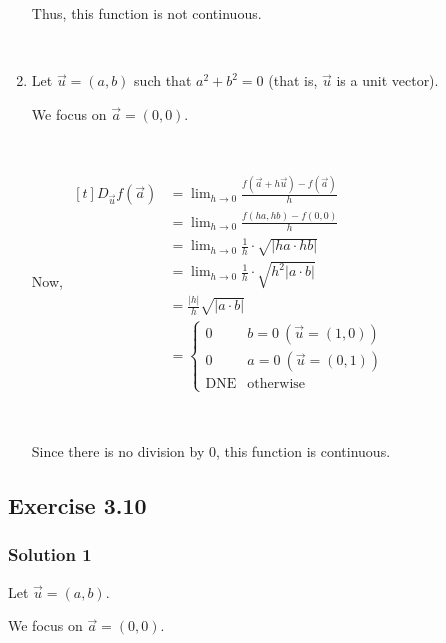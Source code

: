 \begin{enumerate}[label=\alph*)]
    Thus, this function is not continuous. 

    {~~~}

    \item Let $\vec{u} = (a,b)$ such that $a^2 + b^2 = 0$ (that is, $\vec{u}$ is a unit vector). 
    
    We focus on $\vec{a} = (0,0)$. 

    {~~~}

    Now, $\begin{aligned}[t]
        D_{\vec{u}} f(\vec{a}) & = \lim_{h\to0} \frac{f(\vec{a} + h\vec{u}) - f(\vec{a})}{h} \\
                               & = \lim_{h\to0} \frac{f(ha,hb) - f(0,0)}{h}                  \\
                               & = \lim_{h\to0} \frac{1}{h} \cdot \sqrt{| ha \cdot hb |}     \\
                               & = \lim_{h\to0} \frac{1}{h} \cdot \sqrt{h^2 | a \cdot b |}   \\
                               & = \frac{|h|}{h} \sqrt{| a \cdot b |}                        \\
                               & = \begin{cases}
                                       0          & b = 0 ~ (\vec{u} = (1,0)) \\
                                       0          & a = 0 ~ (\vec{u} = (0,1)) \\
                                       \text{DNE} & \text{otherwise}
                                   \end{cases}
        \end{aligned}$

        {~~~}

        Since there is no division by $0$, this function is continuous. 
\end{enumerate}

\subsection*{Exercise 3.10}

\subsubsection*{Solution 1}

Let $\vec{u} = (a,b)$. 

We focus on $\vec{a} = (0,0)$. 

